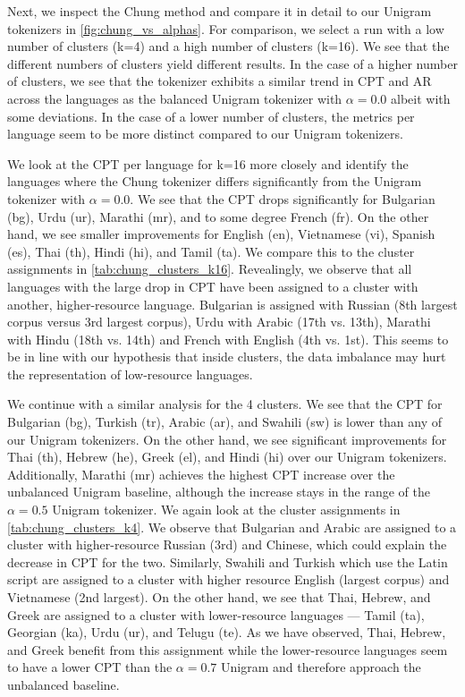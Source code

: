 Next, we inspect the Chung method and compare it in detail to our Unigram tokenizers in \autoref{fig:chung_vs_alphas}. For comparison, we select a run with a low number of clusters (k=4) and a high number of clusters (k=16). We see that the different numbers of clusters yield different results. In the case of a higher number of clusters, we see that the tokenizer exhibits a similar trend in CPT and AR across the languages as the balanced Unigram tokenizer with $\alpha=0.0$ albeit with some deviations. In the case of a lower number of clusters, the metrics per language seem to be more distinct compared to our Unigram tokenizers. 

We look at the CPT per language for k=16 more closely and identify the languages where the Chung tokenizer differs significantly from the Unigram tokenizer with $\alpha=0.0$. We see that the CPT drops significantly for Bulgarian (bg), Urdu (ur), Marathi (mr), and to some degree French (fr). On the other hand, we see smaller improvements for English (en), Vietnamese (vi), Spanish (es), Thai (th), Hindi (hi), and Tamil (ta). We compare this to the cluster assignments in \autoref{tab:chung_clusters_k16}. Revealingly, we observe that all languages with the large drop in CPT have been assigned to a cluster with another, higher-resource language. Bulgarian is assigned with Russian (8th largest corpus versus 3rd largest corpus), Urdu with Arabic (17th vs. 13th), Marathi with Hindu (18th vs. 14th) and French with English (4th vs. 1st). This seems to be in line with our hypothesis that inside clusters, the data imbalance may hurt the representation of low-resource languages.

We continue with a similar analysis for the 4 clusters. We see that the CPT for Bulgarian (bg), Turkish (tr), Arabic (ar), and Swahili (sw) is lower than any of our Unigram tokenizers. On the other hand, we see significant improvements for Thai (th), Hebrew (he), Greek (el), and Hindi (hi) over our Unigram tokenizers. Additionally, Marathi (mr) achieves the highest CPT increase over the unbalanced Unigram baseline, although the increase stays in the range of the $\alpha=0.5$ Unigram tokenizer. We again look at the cluster assignments in \autoref{tab:chung_clusters_k4}. We observe that Bulgarian and Arabic are assigned to a cluster with higher-resource Russian (3rd) and Chinese, which could explain the decrease in CPT for the two. Similarly, Swahili and Turkish which use the Latin script are assigned to a cluster with higher resource English (largest corpus) and Vietnamese (2nd largest). On the other hand, we see that Thai, Hebrew, and Greek are assigned to a cluster with lower-resource languages --- Tamil (ta), Georgian (ka), Urdu (ur), and Telugu (te). As we have observed, Thai, Hebrew, and Greek benefit from this assignment while the lower-resource languages seem to have a lower CPT than the $\alpha=0.7$ Unigram and therefore approach the unbalanced baseline.

